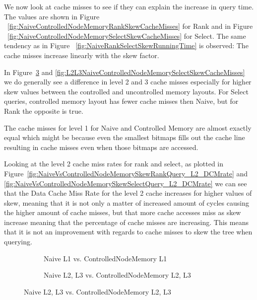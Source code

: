 We now look at cache misses to see if they can explain the increase in query time. 
The values are shown in Figure ~\ref{fig:NaiveControlledNodeMemoryRankSkewCacheMisses} for Rank and in Figure ~\ref{fig:NaiveControlledNodeMemorySelectSkewCacheMisses} for Select.
The same tendency as in Figure ~\ref{fig:NaiveRankSelectSkewRunningTime} is observed: 
The cache misses increase linearly with the skew factor.

In Figure~\ref{fig:L2L3NaiveControlledNodeMemoryRankSkewCacheMisses} and \ref{fig:L2L3NaiveControlledNodeMemorySelectSkewCacheMisses} we do generally see a difference in level 2 and 3 cache misses especially for higher skew values between the controlled and uncontrolled memory layouts. For Select queries, controlled memory layout has fewer cache misses then Naive, but for Rank the opposite is true.

The cache misses for level 1 for Naive and Controlled Memory are almost exactly equal which might be because even the smallest bitmaps fills out the cache line resulting in cache misses even when those bitmaps are accessed.

Looking at the level 2 cache miss rates for rank and select, as plotted in Figure~\ref{fig:NaiveVsControlledNodeMemorySkewRankQuery_L2_DCMrate} and \ref{fig:NaiveVsControlledNodeMemorySkewSelectQuery_L2_DCMrate} we can see that the Data Cache Miss Rate for the level 2 cache increases for higher values of skew, meaning that it is not only a matter of increased amount of cycles causing the higher amount of cache misses, but that more cache accesses miss as skew increase meaning that the percentage of cache misses are increasing.
This means that it is not an improvement with regards to cache misses to skew the tree when querying.

\begin{figure}
\caption{Rank Cache Misses on Wavelet Tree with increasing skew}
\label{fig:NaiveControlledNodeMemoryRankSkewCacheMisses}
\centering
\begin{subfigure}{\textwidth}
	\caption{Naive L1 vs. ControlledNodeMemory L1}
	\label{fig:L1NaiveControlledNodeMemoryRankSkewCacheMisses}
	
	\vspace*{5 mm}
\end{subfigure}
\begin{subfigure}{\textwidth}
	\caption{Naive L2, L3 vs. ControlledNodeMemory L2, L3}
	\label{fig:L2L3NaiveControlledNodeMemoryRankSkewCacheMisses}
 	
\end{subfigure}
\end{figure}

